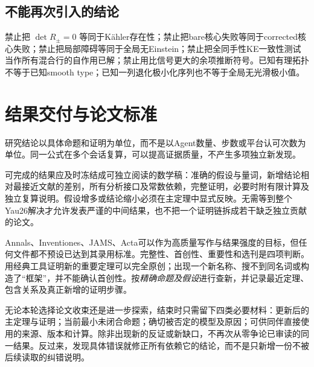 \documentclass[UTF8,a4paper,11pt,fontset=fandol]{ctexart}
\numberwithin{equation}{section}
\theoremstyle{definition}
\begin{document}
\subsection{不能再次引入的结论}
禁止把 $\det R_\pm=0$ 等同于K\"ahler存在性；禁止把bare核心失败等同于corrected核心失败；禁止把局部障碍等同于全局无Einstein；禁止把全同手性KE一致性测试当作所有混合行的自作用已解；禁止用比信号更大的余项推断符号。已知有理拓扑不等于已知smooth type；已知一列退化极小化序列也不等于全局无光滑极小值。

\section{结果交付与论文标准}
研究结论以具体命题和证明为单位，而不是以Agent数量、步数或平台认可次数为单位。同一公式在多个会话复算，可以提高证据质量，不产生多项独立新发现。

可完成的结果应及时冻结成可独立阅读的数学稿：准确的假设与量词，新增结论相对最接近文献的差别，所有分析接口及常数依赖，完整证明，必要时附有限计算及独立复算说明。假设增多或结论缩小必须在主定理中显式反映。无需等到整个Yau26解决才允许发表严谨的中间结果，也不把一个证明链拆成若干缺乏独立贡献的论文。

Annals、Inventiones、JAMS、Acta可以作为高质量写作与结果强度的目标，但任何文件都不预设已达到其录用标准。完整性、首创性、重要性和选刊是四项判断。用经典工具证明新的重要定理可以完全原创；出现一个新名称、搜不到同名词或构造了“框架”，并不能确认首创性。按\emph{精确命题及假设}进行查新，并记录最近定理、包含关系及真正新增的证明步骤。

无论本轮选择论文收束还是进一步探索，结束时只需留下四类必要材料：更新后的主定理与证明；当前最小未闭合命题；确切被否定的模型及原因；可供同伴直接使用的来源、版本和计算。除非出现新的反证或新缺口，不再次从零争论已审读的同一结果。反过来，发现具体错误就修正所有依赖它的结论，而不是只新增一份不被后续读取的纠错说明。
\end{document}
